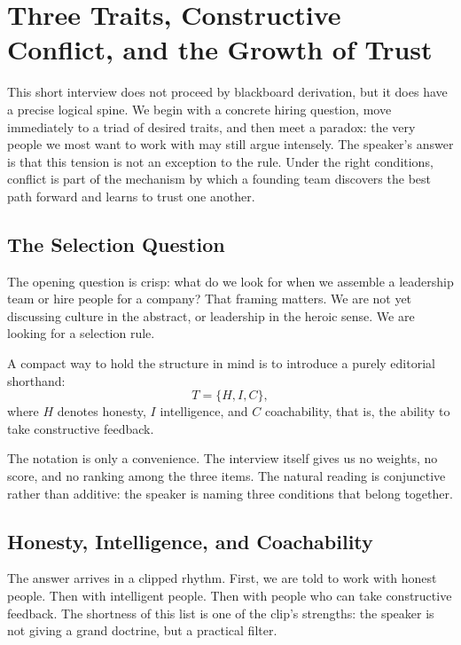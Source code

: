 \chapter{Three Traits, Constructive Conflict, and the Growth of Trust}

This short interview does not proceed by blackboard derivation, but it does have a precise logical spine. We begin with a concrete hiring question, move immediately to a triad of desired traits, and then meet a paradox: the very people we most want to work with may still argue intensely. The speaker's answer is that this tension is not an exception to the rule. Under the right conditions, conflict is part of the mechanism by which a founding team discovers the best path forward and learns to trust one another.

\section{The Selection Question}

The opening question is crisp: what do we look for when we assemble a leadership team or hire people for a company? That framing matters. We are not yet discussing culture in the abstract, or leadership in the heroic sense. We are looking for a selection rule.

A compact way to hold the structure in mind is to introduce a purely editorial shorthand:
\begin{equation}
T = \{H,I,C\},
\end{equation}
where \(H\) denotes honesty, \(I\) intelligence, and \(C\) coachability, that is, the ability to take constructive feedback.

The notation is only a convenience. The interview itself gives us no weights, no score, and no ranking among the three items. The natural reading is conjunctive rather than additive: the speaker is naming three conditions that belong together.

\section{Honesty, Intelligence, and Coachability}

The answer arrives in a clipped rhythm. First, we are told to work with honest people. Then with intelligent people. Then with people who can take constructive feedback. The shortness of this list is one of the clip's strengths: the speaker is not giving a grand doctrine, but a practical filter.

